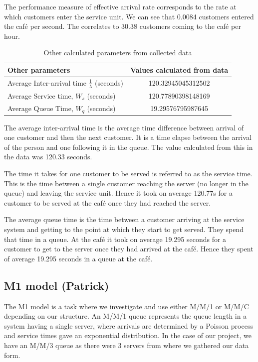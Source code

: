 \documentclass{article}
\begin{document}
The performance measure of effective arrival rate corresponds to the rate at which customers enter the service unit. We can see that 0.0084 customers entered the café per second. The correlates to 30.38 customers coming to the café per hour.

\begin{table}[H]
    \centering
    \caption{Other calculated parameters from collected data}
    \begin{tabu}{X S}
        \toprule
        \textbf{Other parameters} & \textbf{Values calculated from data} \\
        \midrule
        Average Inter-arrival time $\frac{1}{\lambda}$ (seconds) & 120.32945045312502  \\
        Average Service time, $W_s$ (seconds) & 120.77890398148169  \\
        Average Queue Time, $W_q$ (seconds) & 19.29576795987645  \\
        \bottomrule
    \end{tabu}
    \label{tab:Original Data Other}
\end{table}

The average inter-arrival time is the average time difference between arrival of one customer and then the next customer. It is a time elapse between the arrival of the person and one following it in the queue. The value calculated from this in the data was 120.33 seconds.

The time it takes for one customer to be served is referred to as the service time. This is the time between a single customer reaching the server (no longer in the queue) and leaving the service unit. Hence it took on average 120.77s for a customer to be served at the café once they had reached the server.

The average queue time is the time between a customer arriving at the service system and getting to the point at which they start to get served. They spend that time in a queue. At the café it took on average 19.295 seconds for a customer to get to the server once they had arrived at the café. Hence they spent of average 19.295 seconds in a queue at the café.




\subsection{M1 model (Patrick)}

The M1 model is a task where we investigate and use either M/M/1 or M/M/C depending on our structure. An M/M/1 queue represents the queue length in a system having a single server, where arrivals are determined by a Poisson process and service times gave an exponential distribution. In the case of our project, we have an M/M/3 queue as there were 3 servers from where we gathered our data form.
\end{document}
